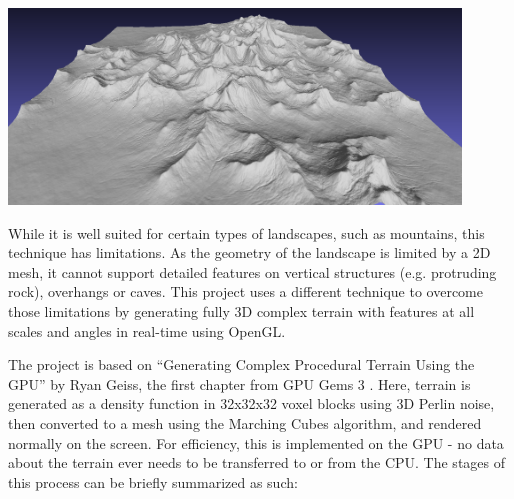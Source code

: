 \documentclass {article}
\begin{document}
\begin{center}
    \includegraphics[width=12cm]{erosion.png}
\end{center}

While it is well suited for certain types of landscapes, such as mountains, this technique has limitations. As the geometry of the landscape is limited by a 2D mesh, it cannot support detailed features on vertical structures (e.g. protruding rock), overhangs or caves. This project uses a different technique to overcome those limitations by generating fully 3D complex terrain with features at all scales and angles in real-time using OpenGL.

The project is based on ``Generating Complex Procedural Terrain Using the GPU'' by Ryan Geiss, the first chapter from GPU Gems 3 \cite{Nguyen:2007:GG:1407436}. Here, terrain is generated as a density function in 32x32x32 voxel blocks using 3D Perlin noise, then converted to a mesh using the Marching Cubes algorithm, and rendered normally on the screen. For efficiency, this is implemented on the GPU - no data about the terrain ever needs to be transferred to or from the CPU. The stages of this process can be briefly summarized as such:

\vspace{5mm}

\end{document}
